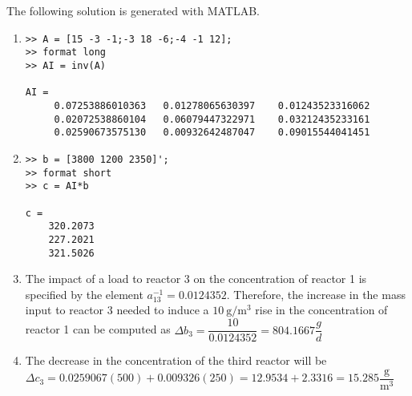 \documentclass[../main.tex]{subfiles}
\begin{document}
\section{}
The following solution is generated with MATLAB.
\bigbreak
\begin{enumerate}[label=\bfseries(\alph*)]
\item
\begin{lstlisting}[numbers=none]	 	 
>> A = [15 -3 -1;-3 18 -6;-4 -1 12];
>> format long
>> AI = inv(A)

AI =
 	 0.07253886010363 	0.01278065630397 	0.01243523316062
	 0.02072538860104 	0.06079447322971 	0.03212435233161
	 0.02590673575130 	0.00932642487047 	0.09015544041451
\end{lstlisting}
\bigbreak
\item 
\begin{lstlisting}[numbers=none]	 	 
>> b = [3800 1200 2350]';
>> format short
>> c = AI*b

c =
 	320.2073
 	227.2021
	321.5026
\end{lstlisting}
\bigbreak
\item 
The impact of a load to reactor 3 on the concentration of reactor 1 is specified by the element $a_{13}^{-1}=0.0124352$. Therefore, the increase in the mass input to reactor 3 needed to induce a $10 \mathrm{~g} / \mathrm{m}^{3}$ rise in the concentration of reactor 1 can be computed as
\bigbreak
$\Delta b_{3}=\dfrac{10}{0.0124352}=804.1667 \dfrac{g}{d}$
\bigbreak
\item The decrease in the concentration of the third reactor will be
\bigbreak
$\Delta c_{3}=0.0259067(500)+0.009326(250)=12.9534+2.3316=15.285 \dfrac{\mathrm{g}}{\mathrm{m}^{3}}$
\bigbreak


\section{}


\end{enumerate}
\end{document}

